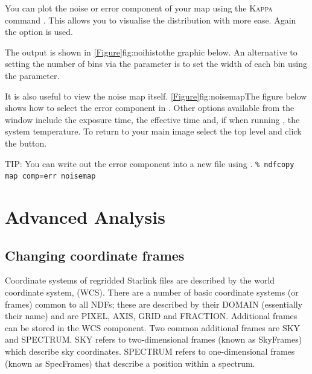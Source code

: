 \documentclass[11pt,oneside,chapters]{starlink}
\begin{document}
You can plot the noise or error component of your map using the
\textsc{Kappa} command \histogram. This allows you to visualise the
distribution with more ease. Again the  option is
used.
\begin{terminalv}
\end{terminalv}
The output is shown in \cref{Figure}{fig:noihisto}{the graphic below}.
An alternative to setting the number of bins via the 
parameter is to set the width of each bin using the 
parameter.


It is also useful to view the noise map itself.
\cref{Figure}{fig:noisemap}{The figure below} shows how to select the
error component in \gaia. Other options available from the
 window include the exposure
time, the effective time and, if  when running
\makecube, the system temperature. To return to your main image select
the top level and click the  button.

\begin{tip}
TIP: You can write out the error component into a new file using
\ndfcopy. \texttt{\% ndfcopy map comp=err noisemap}
\end{tip}




\clearpage
\chapter{Advanced Analysis}
\label{sec:advanced}

\section{Changing coordinate frames}

Coordinate systems of regridded Starlink files are described by the
world coordinate system, (WCS). There are a number of basic coordinate
systems (or frames) common to all NDFs; these are described by their
DOMAIN (essentially their name) and are PIXEL, AXIS, GRID and
FRACTION. Additional frames can be stored in the WCS component. Two
common additional frames are SKY and SPECTRUM. SKY refers to
two-dimensional frames (known as SkyFrames) which describe sky
coordinates. SPECTRUM refers to one-dimensional frames (known as
SpecFrames) that describe a position within a spectrum.
\end{document}
